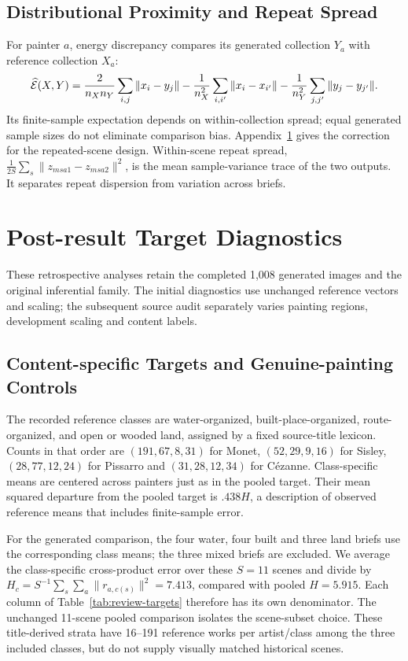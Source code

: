 \subsection{Distributional Proximity and Repeat Spread}
For painter $a$, energy discrepancy compares its generated collection $Y_a$
with reference collection $X_a$:
\begin{equation}
 \widehat{\mathcal E}(X,Y)=\frac{2}{n_Xn_Y}\sum_{i,j}\|x_i-y_j\|
 -\frac1{n_X^2}\sum_{i,i'}\|x_i-x_{i'}\|
 -\frac1{n_Y^2}\sum_{j,j'}\|y_j-y_{j'}\|.
 \label{eq:energy}
\end{equation}
Its finite-sample expectation depends on within-collection spread; equal
generated sample sizes do not eliminate comparison bias. Appendix~\ref{app:diagnostics}
gives the correction for the repeated-scene design. Within-scene repeat spread,
$\frac{1}{2S}\sum_s\|z_{msa1}-z_{msa2}\|^2$, is the mean sample-variance
trace of the two outputs. It separates repeat dispersion from variation across
briefs.


\section{Post-result Target Diagnostics}\label{app:diagnostics}
These retrospective analyses retain the completed 1,008 generated images and
the original inferential family. The initial diagnostics use unchanged reference
vectors and scaling; the subsequent source audit separately varies painting
regions, development scaling and content labels.

\subsection{Content-specific Targets and Genuine-painting Controls}
The recorded reference classes are water-organized, built-place-organized,
route-organized, and open or wooded land, assigned by a fixed source-title
lexicon. Counts in that order are $(191,67,8,31)$ for Monet, $(52,29,9,16)$ for
Sisley, $(28,77,12,24)$ for Pissarro and $(31,28,12,34)$ for C\'ezanne.
Class-specific means are centered across painters just as in the pooled target.
Their mean squared departure from the pooled target is $.438H$, a description
of observed reference means that includes finite-sample error.

For the generated comparison, the four water, four built and three land briefs
use the corresponding class means; the three mixed briefs are excluded.
We average the class-specific cross-product error over these $S=11$ scenes and divide by
$H_c=S^{-1}\sum_s\sum_a\|r_{a,c(s)}\|^2=7.413$, compared with pooled $H=5.915$.
Each column of Table~\ref{tab:review-targets} therefore has its own denominator.
The unchanged 11-scene pooled comparison isolates the scene-subset choice.
These title-derived strata have 16--191 reference works per artist/class among
the three included classes, but do not supply visually matched historical scenes.

